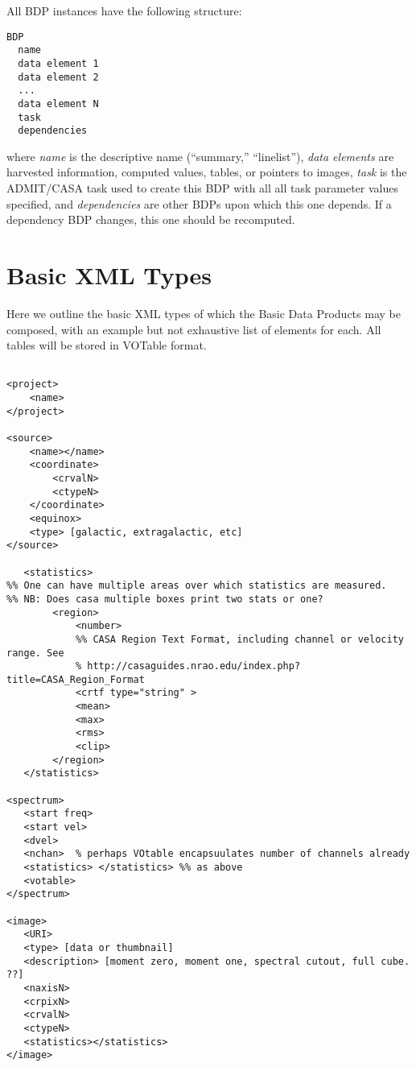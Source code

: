 \documentclass{article}
\begin{document}
\noindent All BDP instances have the following structure:

\begin{verbatim}
BDP
  name 
  data element 1
  data element 2
  ...
  data element N
  task
  dependencies
\end{verbatim}

\noindent where {\it name} is the descriptive name (``summary,''
``linelist''), {\it data elements} are harvested information, computed 
values, tables, or pointers to images, {\it task} is the ADMIT/CASA 
task used to create this BDP with all all task parameter values specified,
and {\it dependencies} are other BDPs upon which this one depends. 
If a dependency BDP changes, this one should be recomputed.


\section{Basic XML Types}

Here we outline the basic XML types of which the Basic Data Products
may be composed, with an example but not exhaustive list of elements for each.
All tables will be stored in VOTable format.
\begin{verbatim}

<project>
    <name>
</project>

<source>
    <name></name>
    <coordinate>
        <crvalN>
        <ctypeN>
    </coordinate>
    <equinox>
    <type> [galactic, extragalactic, etc]
</source>

   <statistics>
%% One can have multiple areas over which statistics are measured.
%% NB: Does casa multiple boxes print two stats or one?
        <region>
            <number>
            %% CASA Region Text Format, including channel or velocity range. See 
            % http://casaguides.nrao.edu/index.php?title=CASA_Region_Format
            <crtf type="string" >
            <mean>
            <max>
            <rms>
            <clip>
        </region>
   </statistics>

<spectrum>
   <start freq>
   <start vel>
   <dvel>
   <nchan>  % perhaps VOtable encapsuulates number of channels already
   <statistics> </statistics> %% as above
   <votable>
</spectrum>

<image>
   <URI>
   <type> [data or thumbnail]
   <description> [moment zero, moment one, spectral cutout, full cube. ??] 
   <naxisN>
   <crpixN>
   <crvalN>
   <ctypeN>
   <statistics></statistics>
</image>
\end{verbatim}
\end{document}
